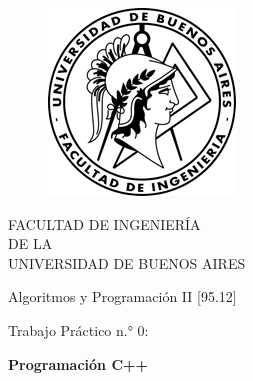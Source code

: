 \documentclass[12pt,a4paper]{report}
\begin{document}
	
	\begin{titlepage}

	\begin{center}

		\vspace*{0.2mm}
			\begin{figure}[htp]
				\begin{center}
					\includegraphics[scale=1]{logo1.jpg} 
				\end{center}
			\end{figure} 

			FACULTAD DE INGENIERÍA \\
			DE LA \\
			UNIVERSIDAD DE BUENOS AIRES\\
		
		\vspace*{0.20in}
	
			\begin{Large}
				Algoritmos y Programación II [95.12]\\
			\end{Large}	
			
		\vspace*{1cm}
	
			\begin{huge}
				Trabajo Práctico n.° 0:\\
			\end{huge}
		
		\vspace*{0.75cm}
	
			\begin{Huge}
				\textbf{Programación C++} \\
			\end{Huge}
		
		\vspace*{1.75cm}
		
		
				

\end{center}
\end{titlepage}
\end{document}
